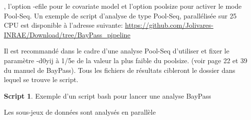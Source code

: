 \documentclass[
  openany]{book}
\theoremstyle{definition}
\theoremstyle{definition}
\newtheorem{example}{Script}[chapter]
\theoremstyle{definition}
\theoremstyle{definition}
\theoremstyle{remark}
\begin{document}
, l'option -efile pour le covariate model et l'option poolsize pour activer le mode Pool-Seq.
Un exemple de script d'analyse de type Pool-Seq, parallélisée sur 25 CPU est disponible à l'adresse suivante:
\url{https://github.com/Jolivares-INRAE/Download/tree/BayPass_pipeline}

Il est recommandé dans le cadre d'une analyse Pool-Seq d'utiliser et fixer le paramètre -d0yij à 1/5e de la valeur la plus faible du poolsize. (voir page 22 et 39 du manuel de BayPass).
Tous les fichiers de résultats cibleront le dossier dans lequel se trouve le script.

\begin{example}
\protect\hypertarget{exm:script4}{}\label{exm:script4}{Exemple d'un script bash pour lancer une analyse BayPass}
\end{example}

Les sous-jeux de données sont analysés en parallèle
\end{document}

